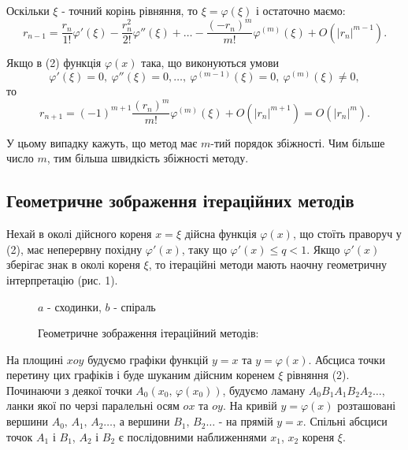 \documentclass[14pt,a4paper,titlepage]{extarticle}
\begin{document}
Оскільки $\xi$ - точний корінь рівняння, то $\xi=\varphi(\xi)$ і остаточно маємо:
$$r_{n-1}=\frac{r_n}{1!}\varphi'(\xi)-\frac{r_n^2}{2!}\varphi''(\xi)+\ldots-\frac{(-r_n)^m}{m!}\varphi^{(m)}(\xi)+O\left(\left|r_n\right|^{m-1}\right).$$

Якщо в (2) функція $\varphi(x)$ така, що виконуються умови 
\begin{equation} 
\varphi'(\xi)=0,\ \varphi''(\xi)=0,\ldots,\ \varphi^{(m-1)}(\xi)=0,\ \varphi^{(m)}(\xi)\neq0,
\end{equation}
то
$$r_{n+1}=(-1)^{m+1}\frac{(r_n)^m}{m!}\varphi^{(m)}(\xi)+O\left(\left|r_n\right|^{m+1}\right)=O\left(\left|r_n\right|^m\right).$$

У цьому випадку кажуть, що метод має $m$-тий порядок збіжності. Чим більше число $m$, тим більша швидкість збіжності методу.

{\centering \subsection{Геометричне зображення ітераційних методів}}

Нехай в околі дійсного кореня $x=\xi$ дійсна функція $\varphi(x)$, що стоїть праворуч у (2), має неперервну похідну $\varphi'(x)$, таку що $\varphi'(x)\leqslant q<1$. Якщо $\varphi'(x)$ зберігає знак в околі кореня $\xi$, то ітераційні методи мають наочну геометричну інтерпретацію (рис. 1).

\begin{figure}[h]
\caption{Геометричне зображення ітераційний методів:}
{$a$ - сходинки, $b$ - спіраль}
\end{figure}

На площині $xoy$ будуємо графіки функцій $y=x$ та $y=\varphi(x)$. Абсциса точки перетину цих графіків і буде шуканим дійсним коренем $\xi$ рівняння (2). Починаючи з деякої точки $A_0(x_0,\,\varphi(x_0))$, будуємо ламану $A_0B_1A_1B_2A_2\ldots$, ланки якої по черзі паралельні осям $ox$ та $oy$. На кривій $y=\varphi(x)$ розташовані вершини $A_0,\,A_1,\,A_2\ldots$, а вершини $B_1,\,B_2\ldots$ - на прямій $y=x$. Спільні абсциси точок $A_1$ і 
$B_1$, $A_2$ і $B_2$ є послідовними наближеннями $x_1$, $x_2$ кореня $\xi$.
\end{document}
